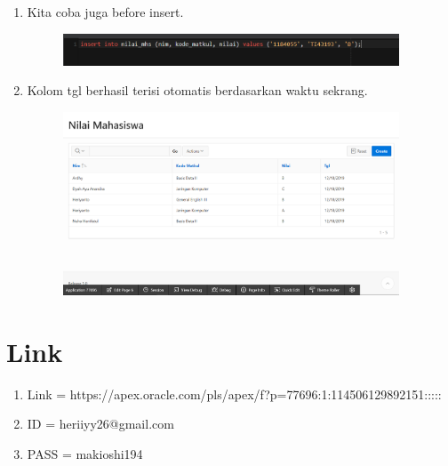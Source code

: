 \documentclass[12pt, times new roman]{article}
\begin{document}
\begin{enumerate}
\begin{figure}[!htbp]
\end{figure}
\item Kita coba juga before insert.
\begin{figure}[!htbp]
	\centering
	\includegraphics[width=10cm]{figures/25.png}
\end{figure}
\item Kolom tgl berhasil terisi otomatis berdasarkan waktu sekrang.
\begin{figure}[!htbp]
	\centering
	\includegraphics[width=10cm]{figures/26.png}
\end{figure}
\end{enumerate}
\section{Link}
\begin{enumerate}
\item Link = https://apex.oracle.com/pls/apex/f?p=77696:1:114506129892151:::::
\item ID = heriiyy26@gmail.com
\item PASS = makioshi194
\end{enumerate}
\end{document}
